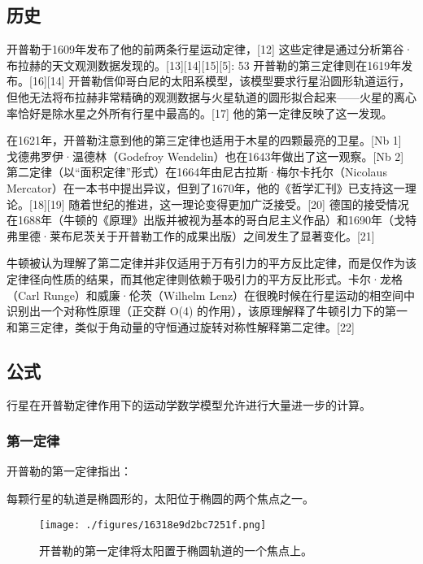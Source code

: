 \subsection{历史}  
开普勒于1609年发布了他的前两条行星运动定律，[12] 这些定律是通过分析第谷·布拉赫的天文观测数据发现的。[13][14][15][5]: 53 开普勒的第三定律则在1619年发布。[16][14] 开普勒信仰哥白尼的太阳系模型，该模型要求行星沿圆形轨道运行，但他无法将布拉赫非常精确的观测数据与火星轨道的圆形拟合起来——火星的离心率恰好是除水星之外所有行星中最高的。[17] 他的第一定律反映了这一发现。

在1621年，开普勒注意到他的第三定律也适用于木星的四颗最亮的卫星。[Nb 1] 戈德弗罗伊·温德林（Godefroy Wendelin）也在1643年做出了这一观察。[Nb 2] 第二定律（以“面积定律”形式）在1664年由尼古拉斯·梅尔卡托尔（Nicolaus Mercator）在一本书中提出异议，但到了1670年，他的《哲学汇刊》已支持这一理论。[18][19] 随着世纪的推进，这一理论变得更加广泛接受。[20] 德国的接受情况在1688年（牛顿的《原理》出版并被视为基本的哥白尼主义作品）和1690年（戈特弗里德·莱布尼茨关于开普勒工作的成果出版）之间发生了显著变化。[21]

牛顿被认为理解了第二定律并非仅适用于万有引力的平方反比定律，而是仅作为该定律径向性质的结果，而其他定律则依赖于吸引力的平方反比形式。卡尔·龙格（Carl Runge）和威廉·伦茨（Wilhelm Lenz）在很晚时候在行星运动的相空间中识别出一个对称性原理（正交群 O(4) 的作用），该原理解释了牛顿引力下的第一和第三定律，类似于角动量的守恒通过旋转对称性解释第二定律。[22]
\subsection{公式} 
行星在开普勒定律作用下的运动学数学模型允许进行大量进一步的计算。  
\subsubsection{第一定律}  
开普勒的第一定律指出：

每颗行星的轨道是椭圆形的，太阳位于椭圆的两个焦点之一。  
\begin{figure}[ht]
\centering
\texttt{[image: ./figures/16318e9d2bc7251f.png]}
\caption{开普勒的第一定律将太阳置于椭圆轨道的一个焦点上。} \label{fig_KPL_2}
\end{figure}

